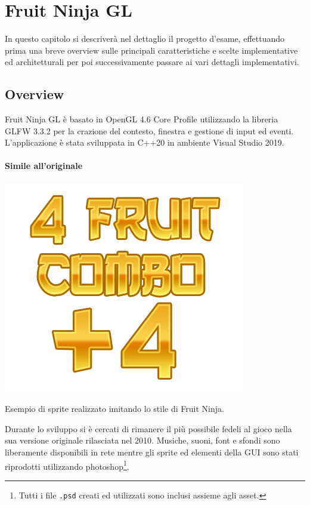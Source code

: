 \setchapterpreamble[u]{\margintoc}
\chapter{Fruit Ninja GL}

\begin{chap-intro}
	In questo capitolo si descriverà nel dettaglio il progetto d'esame, effettuando prima una breve overview sulle principali caratteristiche e scelte implementative ed architetturali per poi successivamente passare ai vari dettagli implementativi.
\end{chap-intro}

\section{Overview}
Fruit Ninja GL è basato in OpenGL 4.6 Core Profile utilizzando la libreria GLFW 3.3.2 per la crazione del contesto, finestra e gestione di input ed eventi. L'applicazione è stata sviluppata in C++20 in ambiente Visual Studio 2019.

\subsubsection{Simile all'originale}
\begin{marginfigure}
	\centering
	\includegraphics[width=0.7\linewidth]{images/ch20/0}
	\caption{Esempio di sprite realizzato imitando lo stile di Fruit Ninja.}
	\label{fig:combo4}
\end{marginfigure}
Durante lo sviluppo si è cercati di rimanere il più possibile fedeli al gioco nella sua versione originale rilasciata nel 2010. Musiche, suoni, font e sfondi sono liberamente disponibili in rete mentre gli sprite ed elementi della GUI sono stati riprodotti utilizzando photoshop\footnote{Tutti i file \texttt{.psd} creati ed utilizzati sono inclusi assieme agli asset.}.

